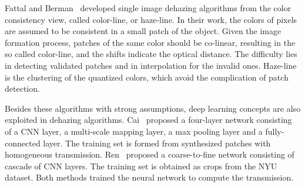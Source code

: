 Fattal and Berman~\cite{fattal2014dehazing,berman2016non} developed single image dehazing algorithms from the color consistency view, called color-line, or haze-line. In their work, the colors of pixels are assumed to be consistent in a small patch of the object. Given the image formation process, patches of the same color should be co-linear, resulting in the so called color-line, and the shifts indicate the optical distance. The difficulty lies in detecting validated patches and in interpolation for the invalid ones. Haze-line is the clustering of the quantized colors, which avoid the complication of patch detection. 

Besides these algorithms with strong assumptions, deep learning concepts are also exploited in dehazing algorithms. Cai~\cite{cai2016dehazenet} proposed a four-layer network consisting of a CNN layer, a multi-scale mapping layer, a max pooling layer and a fully-connected layer. The training set is formed from synthesized patches with homogeneous transmission. Ren~\cite{Ren-ECCV-2016} proposed a coarse-to-fine network consisting of cascade of CNN layers. The training set is obtained as crops from the NYU dataset. Both methods trained the neural network to compute the transmission.

